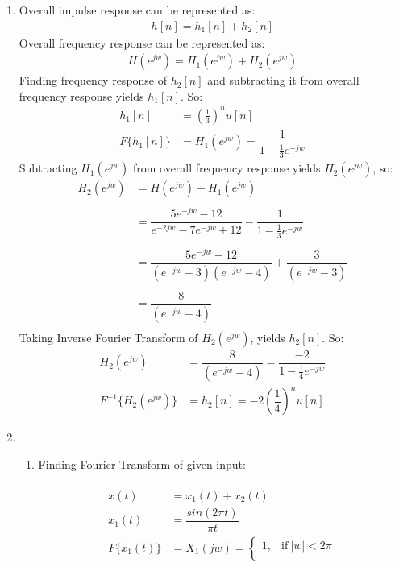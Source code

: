 \documentclass[10pt,a4paper, margin=1in]{article}
\begin{document}
\begin{enumerate}
\item Overall impulse response can be represented as:
    \begin{align*}
    h[n] = h_1[n] + h_2[n]
    \end{align*}
    Overall frequency response can be represented as:
    \begin{align*}
    H(e^{jw}) = H_1(e^{jw}) + H_2(e^{jw})
    \end{align*}
    Finding frequency response of $h_2[n]$ and subtracting it from overall frequency response yields $h_1[n]$. So:
    \begin{align*}
    h_1[n] &= \left(\frac{1}{3}\right)^n u[n] \\
    F\{h_1[n]\} &= H_1(e^{jw}) = \dfrac{1}{1 - \frac{1}{3}e^{-jw}}
    \end{align*}
    Subtracting $H_1(e^{jw})$ from overall frequency response yields $H_2(e^{jw})$, so:
    \begin{align*}
    H_2(e^{jw}) &= H(e^{jw}) - H_1(e^{jw}) \\ \\
    &= \dfrac{5e^{-jw} - 12}{e^{-2jw} - 7e^{-jw} + 12} - \dfrac{1}{1 - \frac{1}{3}e^{-jw}} \\ \\
    &= \dfrac{5e^{-jw} - 12}{(e^{-jw} - 3)(e^{-jw} - 4)} + \dfrac{3}{(e^{-jw} - 3)} \\ \\
    &= \dfrac{8}{(e^{-jw} - 4)} \\
    \end{align*}
    Taking Inverse Fourier Transform of $H_2(e^{jw})$, yields $h_2[n]$. So:
    \begin{align*}
    H_2(e^{jw}) &= \dfrac{8}{(e^{-jw} - 4)} = \dfrac{-2}{1 - \frac{1}{4}e^{-jw}} \\
    F^{-1}\{H_2(e^{jw})\} &= h_2[n] = -2\left( \dfrac{1}{4} \right)^n u[n]
    \end{align*}
\item      
    \begin{enumerate}
    \item Finding Fourier Transform of given input: \\
    \\
    \begin{align*}
    x(t) &= x_1(t) + x_2(t) \\
    x_1(t) &= \dfrac{sin(2\pi t)}{\pi t} \\
    F\{x_1(t)\} &= X_1(jw) = \begin{cases}
                               1, & \text{if}\ |w| < 2\pi \\

\end{cases}
\end{align*}
\end{enumerate}
\end{enumerate}
\end{document}
